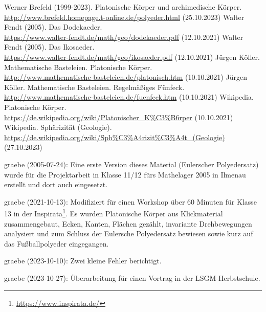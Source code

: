 \documentclass[11pt]{article}
\begin{document}
\begin{thebibliography}{xxx}
 Werner Brefeld (1999-2023). Platonische Körper und
  archimedische Körper.\\
  \url{http://www.brefeld.homepage.t-online.de/polyeder.html} (25.10.2023) 
 Walter Fendt (2005). Das Dodekaeder.\\
  \url{https://www.walter-fendt.de/math/geo/dodekaeder.pdf} (12.10.2021) 
 Walter Fendt (2005). Das Ikosaeder.\\
  \url{https://www.walter-fendt.de/math/geo/ikosaeder.pdf} (12.10.2021) 
 Jürgen Köller. Mathematische Basteleien.
  Platonische Körper.\\
  \url{http://www.mathematische-basteleien.de/platonisch.htm} (10.10.2021)
 Jürgen Köller. Mathematische Basteleien.
  Regelmäßiges Fünfeck.\\
  \url{http://www.mathematische-basteleien.de/fuenfeck.htm} (10.10.2021)
 Wikipedia. Platonische Körper.\\ 
  \url{https://de.wikipedia.org/wiki/Platonischer_K%C3%B6rper} (10.10.2021)
 Wikipedia. Sphärizität (Geologie).\\ 
  \url{https://de.wikipedia.org/wiki/Sph%C3%A4rizit%C3%A4t_(Geologie)}\\
    (27.10.2023)
\end{thebibliography}

\begin{attribution}
graebe (2005-07-24): Eine erste Version dieses Material (Eulerscher
Polyedersatz) wurde für die Projektarbeit in Klasse 11/12 fürs Mathelager 2005
in Ilmenau erstellt und dort auch eingesetzt.

graebe (2021-10-13): Modifiziert für einen Workshop über 60 Minuten für Klasse
13 in der Inspirata\footnote{\url{https://www.inspirata.de/}}.  Es wurden
Platonische Körper aus Klickmaterial zusammengebaut, Ecken, Kanten, Flächen
gezählt, invariante Drehbewegungen analysiert und zum Schluss der Eulersche
Polyedersatz bewiesen sowie kurz auf das Fußballpolyeder eingegangen.

graebe (2023-10-10): Zwei kleine Fehler berichtigt.

graebe (2023-10-27): Überarbeitung für einen Vortrag in der
LSGM-Herbstschule. 
\end{attribution}
\end{document}

